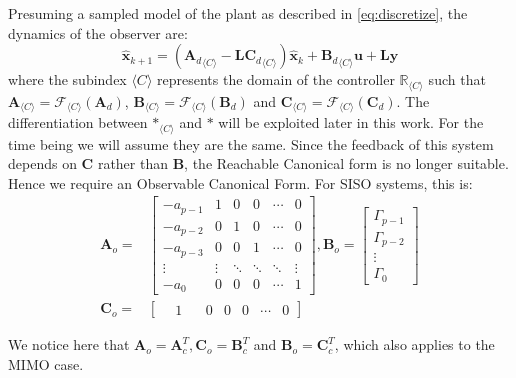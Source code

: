 \documentclass[sigconf]{llncs}
\newcommand{\mat}[1]{\boldsymbol{#1}}
\renewcommand{\vec}[1]{\boldsymbol{#1}}
\begin{document}
Presuming a sampled model of the plant as described in \eqref{eq:discretize}, the dynamics of the observer are:
\begin{equation}
\label{eq:to_of}
\hat{\vec{x}}_{k+1}=({\mat{A}_d}_{\langle C \rangle}-\mat{L}{\mat{C}_d}_{\langle C \rangle})\hat{\vec{x}}_k+{\mat{B}_d}_{\langle C \rangle}\vec{u}+\mat{L}\vec{y}
\end{equation}
where the subindex ${\langle C \rangle}$ represents the domain of the controller $\mathbb{R}_{\langle C \rangle}$ such that ${\mat{A}_{\langle C \rangle}=\mathcal{F}_{\langle C \rangle}(\mat{A}_d)}$, ${\mat{B}_{\langle C \rangle}=\mathcal{F}_{\langle C \rangle}(\mat{B}_d)}$ and ${\mat{C}_{\langle C \rangle}=\mathcal{F}_{\langle C \rangle}(\mat{C}_d)}$.
The differentiation between $\mat{*}_{\langle C \rangle}$ and $\mat{*}$ will be exploited later in this work. For the time being we will assume they are the same. 
Since the feedback of this system depends on $\mat{C}$ rather than $\mat{B}$, the Reachable
Canonical form is no longer suitable. Hence we require an Observable Canonical Form.
For SISO systems, this is:
\begin{align}
\label{of_SISO}
\mat{A}_o=&\left[
\begin{array}{cccccc}
-a_{p-1}&1&0&0&\cdots&0\\
-a_{p-2}&0&1&0&\cdots&0\\
-a_{p-3}&0&0&1&\cdots&0\\
\vdots&\vdots&\ddots&\ddots&\ddots&\vdots\\
-a_0&0&0&0&\cdots&1
\end{array}\right],
\mat{B}_o=\left[
\begin{array}{c}
\Gamma_{p-1}\\ \Gamma_{p-2}\\ \vdots\\ \Gamma_0
\end{array}\right]\\
\mat{C}_o=&[\begin{array}{cccccc}\ \ \ \ 1&\ \ \ \ 0&0&0&\cdots&0\end{array}] \nonumber
\end{align}

We notice here that $\mat{A}_o=\mat{A}_c^T, \mat{C}_o=\mat{B}_c^T$
and $\mat{B}_o=\mat{C}_c^T$, which also applies to the MIMO case.
\end{document}
